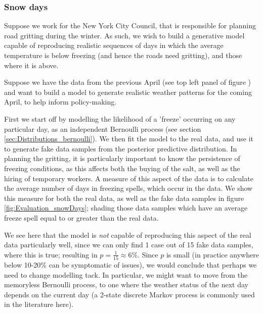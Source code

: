 \documentclass[11pt,fullpage]{book}
\begin{document}
\subsubsection{Snow days}
Suppose we work for the New York City Council, that is responsible for planning road gritting during the winter. As such, we wish to build a generative model capable of reproducing realistic sequences of days in which the average temperature is below freezing (and hence the roads need gritting), and those where it is above.

Suppose we have the data from the previous April (see top left panel of figure ) and want to build a model to generate realistic weather patterns for the coming April, to help inform policy-making. 

First we start off by modelling the likelihood of a 'freeze' occurring on any particular day, as an independent Bernoulli process (see section \ref{sec:Distributions_bernoulli}). We then fit the model to the real data, and use it to generate fake data samples from the posterior predictive distribution. In planning the gritting, it is particularly important to know the persistence of freezing conditions, as this affects both the buying of the salt, as well as the hiring of temporary workers. A measure of this aspect of the data is to calculate the average number of days in freezing spells, which occur in the data. We show this measure for both the real data, as well as the fake data samples in figure \ref{fig:Evaluation_snowDays}; shading those data samples which have an average freeze spell equal to or greater than the real data. 

We see here that the model is \textit{not} capable of reproducing this aspect of the real data particularly well, since we can only find 1 case out of 15 fake data samples, where this is true; resulting in $p=\frac{1}{15}\approx 6\%$. Since $p$ is small (in practice anywhere below 10-20\% can be symptomatic of issues), we would conclude that perhaps we need to change modelling tack. In particular, we might want to move from the memoryless Bernoulli process, to one where the weather status of the next day depends on the current day (a 2-state discrete Markov process is commonly used in the literature here). 
\end{document}
